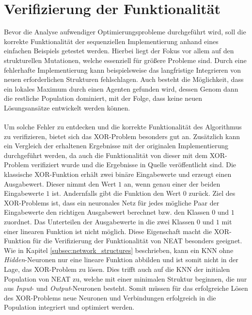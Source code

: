 \section{Verifizierung der Funktionalität}
\label{sec:analysis_valdation_functionality}
Bevor die Analyse aufwendiger Optimierungsprobleme durchgeführt wird, soll die korrekte Funktionalität der sequenziellen Implementierung anhand eines einfachen Beispiels getestet werden. Hierbei liegt der Fokus vor allem auf den strukturellen Mutationen, welche essenziell für größere Probleme sind. Durch eine fehlerhafte Implementierung kann beispielsweise das langfristige Integrieren von neuen erforderlichen Strukturen fehlschlagen. Auch besteht die Möglichkeit, dass ein lokales Maximum durch einen Agenten gefunden wird, dessen Genom dann die restliche Population dominiert, mit der Folge, dass keine neuen Lösungsansätze entwickelt werden können.
\\\\
Um solche Fehler zu entdecken und die korrekte Funktionalität des Algorithmus zu verifizieren, bietet sich das XOR-Problem besonders gut an. Zusätzlich kann ein Vergleich der erhaltenen Ergebnisse mit der originalen Implementierung durchgeführt werden, da auch die Funktionalität von dieser mit dem XOR-Problem verifiziert wurde und die Ergebnisse in Quelle \cite{stanley2002evolving} veröffentlicht sind. Die klassische XOR-Funktion erhält zwei binäre Eingabewerte und erzeugt einen Ausgabewert. Dieser nimmt den Wert $1$ an, wenn genau einer der beiden Eingabewerte $1$ ist. Andernfalls gibt die Funktion den Wert $0$ zurück. Ziel des XOR-Problems ist, dass ein neuronales Netz für jedes mögliche Paar der Eingabewerte den richtigen Ausgabewert berechnet bzw. den Klassen $0$ und $1$ zuordnet. Das Unterteilen der Ausgabewerte in die zwei Klassen $0$ und $1$ mit einer linearen Funktion ist nicht möglich. Diese Eigenschaft macht die XOR-Funktion für die Verifizierung der Funktionalität von \ac{NEAT} besonders geeignet. Wie in Kapitel \ref{subsec:network_structures} beschrieben, kann ein \ac{KNN} ohne \emph{Hidden}-Neuronen nur eine lineare Funktion abbilden und ist somit nicht in der Lage, das XOR-Problem zu lösen. Dies trifft auch auf die \ac{KNN} der initialen Population von \ac{NEAT} zu, welche mit einer minimalen Struktur beginnen, die nur aus \emph{Input}- und \emph{Output}-Neuronen besteht. Somit müssen für das erfolgreiche Lösen des XOR-Problems neue Neuronen und Verbindungen erfolgreich in die Population integriert und optimiert werden. 

